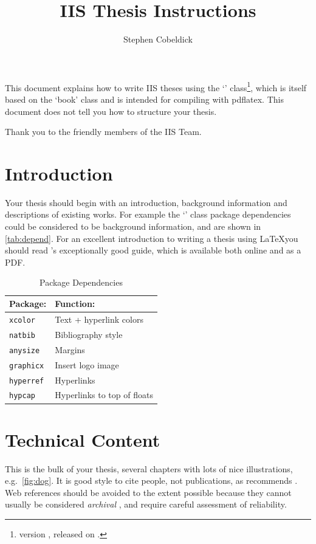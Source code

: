 \documentclass[bachelor]{iisthesis}
\title{IIS Thesis Instructions}
\author{Stephen Cobeldick}
\begin{document}
\maketitle

This document explains how to write IIS theses using the \LaTeXe\space `\uibkclass' class\footnote{version \uibkversion\space, released on \uibkreleased.}, which is itself based on the \LaTeXe\space `book' class and is intended for compiling with pdflatex. This document does not tell you how to structure your thesis.

Thank you to the friendly members of the IIS Team.

\tableofcontents
\listoffigures
\listoftables
\uibkdeclaration
\label{chap:declare}

\chapter{Introduction}
Your thesis should begin with an introduction, background information and descriptions of existing works. For example the `\uibkclass' class package dependencies could be considered to be background information, and are shown in \autoref{tab:depend}. For an excellent introduction to writing a thesis using \LaTeX\space you should read \cite{Talbot-2007-ThesisGuide}'s exceptionally good guide, which is available both online and as a PDF.

\begin{table}
  \centering
  \begin{tabular}{|l|l|}
    \hline
    Package:            & Function: \\
    \hline
    \texttt{xcolor}   & Text + hyperlink colors    \\
    \texttt{natbib}   & Bibliography style         \\
    \texttt{anysize}  & Margins                    \\
    \texttt{graphicx} & Insert logo image          \\
    \texttt{hyperref} & Hyperlinks                 \\
    \texttt{hypcap}   & Hyperlinks to top of floats\\
    \hline
  \end{tabular}
  \caption{Package Dependencies}
  \label{tab:depend}
\end{table}

\chapter{Technical Content}
This is the bulk of your thesis, several chapters with lots of nice illustrations, e.g.\ \autoref{fig:dog}.  It is good style to cite people, not publications, as recommends \cite{Piater-2011-IISreport}.  Web references should be avoided to the extent possible because they cannot usually be considered \emph{archival} \citep{Wikipedia-Archive}, and require careful assessment of reliability.
\end{document}
